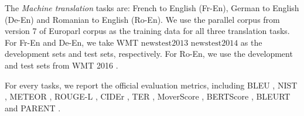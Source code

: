 The \emph{Machine translation} tasks are: French to English (Fr-En), German to English (De-En) and Romanian to English (Ro-En). We use the parallel corpus from version 7 of Europarl corpus \cite{koehn2005europarl} as the training data for all three translation tasks. For Fr-En and De-En, we take WMT $\mathrm{newstest2013}$ $\mathrm{newstest2014}$ \cite{bojar2014findings} as the development sets and test sets, respectively. For Ro-En, we use the development and test sets from WMT 2016 \cite{bojar2016findings}.

For every tasks, we report the official evaluation metrics, including BLEU \cite{papineni2002bleu}, NIST \cite{belz2006nist}, METEOR \cite{lavie2007meteor}, ROUGE-L \cite{lin2004rouge}, CIDEr \cite{vedantam2015cider}, TER \cite{snover2005ter}, MoverScore \cite{zhao2019moverscore}, BERTScore \cite{zhang2019bertscore}, BLEURT \cite{sellam2020bleurt} and PARENT \cite{dhingra2019parent}.

